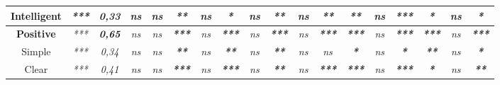 \begin{sidewaystable}[h]
\begin{tabular}{c|cc|ccccccccccccccc|}
        \multicolumn{1}{|c|}{Intelligent}            & \multicolumn{1}{c|}{\textit{***}} & \textit{0,33}          & \multicolumn{1}{c|}{\textit{ns}} & \multicolumn{1}{c|}{\textit{ns}} & \multicolumn{1}{c|}{\textit{\textbf{**}}}  & \multicolumn{1}{c|}{\textit{ns}}          & \multicolumn{1}{c|}{\textit{\textbf{*}}}   & \multicolumn{1}{c|}{\textit{ns}} & \multicolumn{1}{c|}{\textit{\textbf{**}}}  & \multicolumn{1}{c|}{\textit{ns}} & \multicolumn{1}{c|}{\textit{\textbf{**}}}  & \multicolumn{1}{c|}{\textit{\textbf{**}}}  & \multicolumn{1}{c|}{\textit{ns}}         & \multicolumn{1}{c|}{\textit{\textbf{***}}} & \multicolumn{1}{c|}{\textit{\textbf{*}}}   & \multicolumn{1}{c|}{\textit{ns}} & \textit{\textbf{*}}   \\ \hline
        \multicolumn{1}{|c|}{\textbf{Positive}}      & \multicolumn{1}{c|}{\textit{***}} & \textit{\textbf{0,65}} & \multicolumn{1}{c|}{\textit{ns}} & \multicolumn{1}{c|}{\textit{ns}} & \multicolumn{1}{c|}{\textit{\textbf{***}}} & \multicolumn{1}{c|}{\textit{ns}}          & \multicolumn{1}{c|}{\textit{\textbf{***}}} & \multicolumn{1}{c|}{\textit{ns}} & \multicolumn{1}{c|}{\textit{\textbf{***}}} & \multicolumn{1}{c|}{\textit{ns}} & \multicolumn{1}{c|}{\textit{\textbf{***}}} & \multicolumn{1}{c|}{\textit{\textbf{***}}} & \multicolumn{1}{c|}{\textit{ns}}         & \multicolumn{1}{c|}{\textit{\textbf{***}}} & \multicolumn{1}{c|}{\textit{\textbf{***}}} & \multicolumn{1}{c|}{\textit{ns}} & \textit{\textbf{***}} \\ \hline
        \multicolumn{1}{|c|}{Simple}                 & \multicolumn{1}{c|}{\textit{***}} & \textit{0,34}          & \multicolumn{1}{c|}{\textit{ns}} & \multicolumn{1}{c|}{\textit{ns}} & \multicolumn{1}{c|}{\textit{\textbf{**}}}  & \multicolumn{1}{c|}{\textit{ns}}          & \multicolumn{1}{c|}{\textit{\textbf{**}}}  & \multicolumn{1}{c|}{\textit{ns}} & \multicolumn{1}{c|}{\textit{\textbf{**}}}  & \multicolumn{1}{c|}{\textit{ns}} & \multicolumn{1}{c|}{\textit{ns}}           & \multicolumn{1}{c|}{\textit{\textbf{*}}}   & \multicolumn{1}{c|}{\textit{ns}}         & \multicolumn{1}{c|}{\textit{\textbf{*}}}   & \multicolumn{1}{c|}{\textit{\textbf{**}}}  & \multicolumn{1}{c|}{\textit{ns}} & \textit{\textbf{*}}   \\ \hline
        \multicolumn{1}{|c|}{Clear}                  & \multicolumn{1}{c|}{\textit{***}} & \textit{0,41}          & \multicolumn{1}{c|}{\textit{ns}} & \multicolumn{1}{c|}{\textit{ns}} & \multicolumn{1}{c|}{\textit{\textbf{***}}} & \multicolumn{1}{c|}{\textit{ns}}          & \multicolumn{1}{c|}{\textit{\textbf{***}}} & \multicolumn{1}{c|}{\textit{ns}} & \multicolumn{1}{c|}{\textit{\textbf{**}}}  & \multicolumn{1}{c|}{\textit{ns}} & \multicolumn{1}{c|}{\textit{\textbf{***}}} & \multicolumn{1}{c|}{\textit{\textbf{***}}} & \multicolumn{1}{c|}{\textit{ns}}         & \multicolumn{1}{c|}{\textit{\textbf{***}}} & \multicolumn{1}{c|}{\textit{\textbf{*}}}   & \multicolumn{1}{c|}{\textit{ns}} & \textit{\textbf{**}}  \\ \hline

\end{tabular}
\end{sidewaystable}
